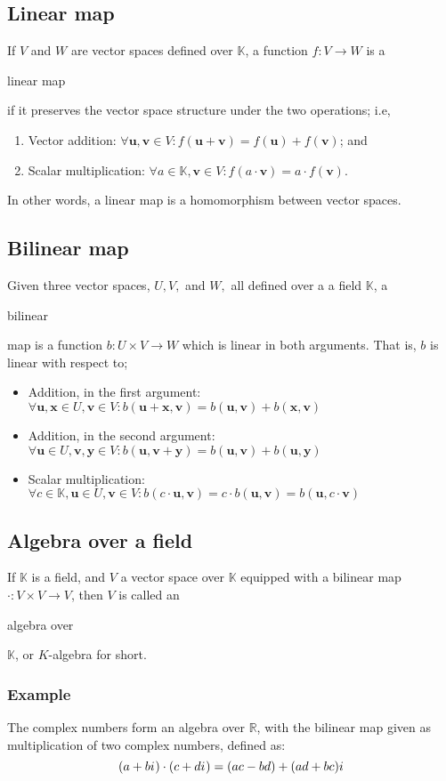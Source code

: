\documentclass{article}
\newenvironment{itemized}{
\begin{itemize}
\setlength{\itemsep}{0pt}
\setlength{\parskip}{0pt}
\setlength{\parsep}{0pt}
}{\end{itemize}}
\newenvironment{enumerated}{
\begin{enumerate}
\setlength{\itemsep}{0pt}
\setlength{\parskip}{0pt}
\setlength{\parsep}{0pt}
}{\end{enumerate}}
\renewcommand{\vec}[1]{\mathbf{#1}}
\newcommand{\iu}{{i\mkern1mu}}
\begin{document}
\subsection*{Linear map}
If $V$ and $W$ are vector spaces defined over $\mathbb{K}$, a function $f : V \rightarrow W$ is a \begin{em}linear map\end{em} if it preserves the vector space structure under the two operations; i.e,
\begin{enumerated}
  \item Vector addition: $ \forall \vec{u}, \vec{v} \in V : f(\vec{u} + \vec{v}) = f(\vec{u}) + f(\vec{v}) $; and
  \item Scalar multiplication: $ \forall a \in \mathbb{K}, \vec{v} \in V : f(a \cdot \vec{v}) = a \cdot f(\vec{v}). $
\end{enumerated}
In other words, a linear map is a homomorphism between vector spaces.

\subsection*{Bilinear map}
Given three vector spaces, $U, V, $ and $W,$ all defined over a a field $\mathbb{K}$, a \begin{em}bilinear\end{em} map is a function $b : U \times V \rightarrow W$ which is linear in both arguments. That is, $b$ is linear with respect to;
\begin{itemized}
  \item Addition, in the first argument: $ \forall \vec{u}, \vec{x} \in U, \vec{v} \in V : b(\vec{u} + \vec{x}, \vec{v}) = b(\vec{u}, \vec{v}) + b(\vec{x}, \vec{v}) $
  \item Addition, in the second argument: $ \forall \vec{u} \in U, \vec{v}, \vec{y} \in V : b(\vec{u}, \vec{v} + \vec{y}) = b(\vec{u}, \vec{v}) + b(\vec{u}, \vec{y}) $
  \item Scalar multiplication: $ \forall c \in \mathbb{K}, \vec{u} \in U, \vec{v} \in V : b(c \cdot \vec{u}, \vec{v}) = c \cdot b(\vec{u}, \vec{v}) = b(\vec{u}, c \cdot \vec{v}) $
\end{itemized}

\subsection*{Algebra over a field}
If $\mathbb{K}$ is a field, and $V$ a vector space over $\mathbb{K}$ equipped with a bilinear map $\cdot : V \times V \rightarrow V$, then $V$ is called an \begin{em}algebra over\end{em} $\mathbb{K}$, or $K$-algebra for short.

\subsubsection*{Example}
The complex numbers form an algebra over $\mathbb{R}$, with the bilinear map given as multiplication of two complex numbers, defined as:
$$
(a + b\iu) \cdot (c + d\iu) = (ac - bd) + (ad + bc)\iu
$$
\end{document}
